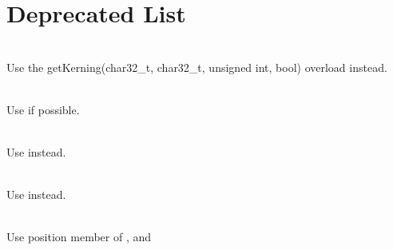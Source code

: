 \chapter{Deprecated List }
\hypertarget{deprecated}{}\label{deprecated}

\begin{DoxyRefList}
\item[Member \doxylink{classsf_1_1Font_ab92c0eb62d334b0f54dfe67d34b25e00}{sf\+::Font\+::get\+Kerning} (std\+::uint32\+\_\+t first, std\+::uint32\+\_\+t second, unsigned int character\+Size, bool bold=false) const]\hfill \\
\label{deprecated__deprecated000001}%
%
Use the {\ttfamily get\+Kerning(char32\+\_\+t, char32\+\_\+t, unsigned int, bool)} overload instead. 
\item[Class \doxylink{classsf_1_1Ftp}{sf\+::Ftp} ]\hfill \\
\label{deprecated__deprecated000003}%
%
Use {\ttfamily {}} if possible. 
\item[Member \doxylink{classsf_1_1IpAddress_a4a78be2d092625c1216820037c2920c0}{sf\+::Ip\+Address\+::resolve} (std\+::string\+\_\+view address)]\hfill \\
\label{deprecated__deprecated000004}%
%
Use {\ttfamily {}} instead. 
\item[Member \doxylink{classsf_1_1Text_a2e252d8dcae3eb61c6c962c0bc674b12}{sf\+::Text\+::find\+Character\+Pos} (std\+::size\+\_\+t index) const]\hfill \\
\label{deprecated__deprecated000002}%
%
Use {\ttfamily {}} instead. 
\item[Member \doxylink{namespacesf_1_1Touch_ade367f33a577c38a61ecd67ea2313856}{sf\+::Touch\+::get\+Position} (unsigned int finger)]\hfill \\
\label{deprecated__deprecated000006}%
%
Use position member of {\ttfamily {}}, {\ttfamily {}} and {\ttfamily {}} 

\end{DoxyRefList}
